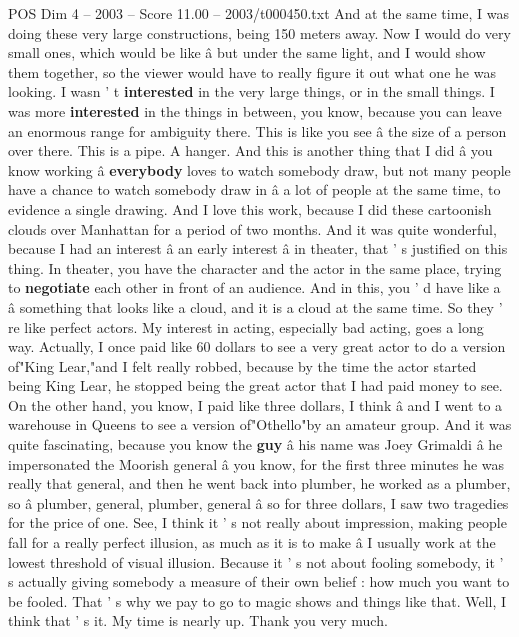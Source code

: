 \begin{textsample}{POS Dim 4 – 2003 – Score 11.00 – 2003/t000450.txt}
And at the same time, I was doing these very large constructions, being 150 meters away.
Now I would do very small ones, which would be like â but under the same light, and I would show them together, so the viewer would have to really figure it out what one he was looking.
I wasn ' t \textbf{interested} in the very large things, or in the small things.
I was more \textbf{interested} in the things in between, you know, because you can leave an enormous range for ambiguity there.
This is like you see â the size of a person over there.
This is a pipe.
A hanger.
And this is another thing that I did â you know working â \textbf{everybody} loves to watch somebody draw, but not many people have a chance to watch somebody draw in â a lot of people at the same time, to evidence a single drawing.
And I love this work, because I did these cartoonish clouds over Manhattan for a period of two months.
And it was quite wonderful, because I had an interest â an early interest â in theater, that ' s justified on this thing.
In theater, you have the character and the actor in the same place, trying to \textbf{negotiate} each other in front of an audience.
And in this, you ' d have like a â something that looks like a cloud, and it is a cloud at the same time.
So they ' re like perfect actors.
My interest in acting, especially bad acting, goes a long way.
Actually, I once paid like 60 dollars to see a very great actor to do a version of"King Lear,"and I felt really robbed, because by the time the actor started being King Lear, he stopped being the great actor that I had paid money to see.
On the other hand, you know, I paid like three dollars, I think â and I went to a warehouse in Queens to see a version of"Othello"by an amateur group.
And it was quite fascinating, because you know the \textbf{guy} â his name was Joey Grimaldi â he impersonated the Moorish general â you know, for the first three minutes he was really that general, and then he went back into plumber, he worked as a plumber, so â plumber, general, plumber, general â so for three dollars, I saw two tragedies for the price of one.
See, I think it ' s not really about impression, making people fall for a really perfect illusion, as much as it is to make â I usually work at the lowest threshold of visual illusion.
Because it ' s not about fooling somebody, it ' s actually giving somebody a measure of their own belief : how much you want to be fooled.
That ' s why we pay to go to magic shows and things like that.
Well, I think that ' s it.
My time is nearly up.
Thank you very much.

\end{textsample}
